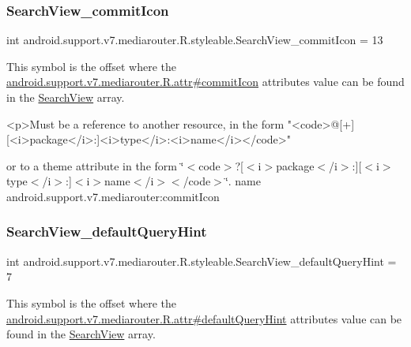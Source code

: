 \subsubsection{\texorpdfstring{Search\+View\+\_\+commit\+Icon}{SearchView\_commitIcon}}
{\footnotesize\ttfamily int android.\+support.\+v7.\+mediarouter.\+R.\+styleable.\+Search\+View\+\_\+commit\+Icon = 13\hspace{0.3cm}{\ttfamily [static]}}

This symbol is the offset where the \hyperlink{classandroid_1_1support_1_1v7_1_1mediarouter_1_1R_1_1attr_a0800b9b67e1f73a4a0923cf4e1122759}{android.\+support.\+v7.\+mediarouter.\+R.\+attr\#commit\+Icon} attribute\textquotesingle{}s value can be found in the \hyperlink{classandroid_1_1support_1_1v7_1_1mediarouter_1_1R_1_1styleable_a5573e3195bf93122a37c69394418c7d7}{Search\+View} array.

\begin{DoxyVerb}      <p>Must be a reference to another resource, in the form "<code>@[+][<i>package</i>:]<i>type</i>:<i>name</i></code>"
\end{DoxyVerb}
 or to a theme attribute in the form \char`\"{}$<$code$>$?\mbox{[}$<$i$>$package$<$/i$>$\+:\mbox{]}\mbox{[}$<$i$>$type$<$/i$>$\+:\mbox{]}$<$i$>$name$<$/i$>$$<$/code$>$\char`\"{}.  name android.\+support.\+v7.\+mediarouter\+:commit\+Icon \mbox{\label{classandroid_1_1support_1_1v7_1_1mediarouter_1_1R_1_1styleable_a4bee2315e2c3bab5b734df62936a8ad9}} 
\subsubsection{\texorpdfstring{Search\+View\+\_\+default\+Query\+Hint}{SearchView\_defaultQueryHint}}
{\footnotesize\ttfamily int android.\+support.\+v7.\+mediarouter.\+R.\+styleable.\+Search\+View\+\_\+default\+Query\+Hint = 7\hspace{0.3cm}{\ttfamily [static]}}

This symbol is the offset where the \hyperlink{classandroid_1_1support_1_1v7_1_1mediarouter_1_1R_1_1attr_ad68760a1fd767d292c3eb3ea720e2ecc}{android.\+support.\+v7.\+mediarouter.\+R.\+attr\#default\+Query\+Hint} attribute\textquotesingle{}s value can be found in the \hyperlink{classandroid_1_1support_1_1v7_1_1mediarouter_1_1R_1_1styleable_a5573e3195bf93122a37c69394418c7d7}{Search\+View} array.

